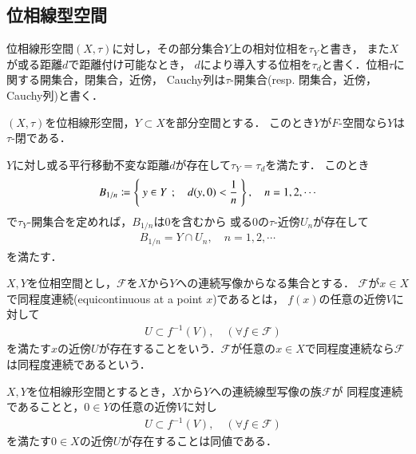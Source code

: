 \subsection{位相線型空間}
	
	位相線形空間$(X,\tau)$に対し，その部分集合$Y$上の相対位相を$\tau_Y$と書き，
	また$X$が或る距離$d$で距離付け可能なとき，
	$d$により導入する位相を$\tau_d$と書く．位相$\tau$に関する開集合，閉集合，近傍，
	Cauchy列は$\tau$-開集合(resp. 閉集合，近傍，Cauchy列)と書く．
	
	\begin{screen}
		\begin{thm}
			$(X,\tau)$を位相線形空間，$Y \subset X$を部分空間とする．
			このとき$Y$が$F$-空間なら$Y$は$\tau$-閉である．
		\end{thm}
	\end{screen}
	
	\begin{prf}
		$Y$に対し或る平行移動不変な距離$d$が存在して$\tau_Y = \tau_d$を満たす．
		このとき
		\begin{align}
			B_{1/n} \coloneqq \left\{\ y \in Y\ \, ; \quad d(y,0) < \frac{1}{n}\ \right\},
			\quad n=1,2,\cdots
		\end{align}
		で$\tau_Y$-開集合を定めれば，$B_{1/n}$は$0$を含むから
		或る0の$\tau$-近傍$U_n$が存在して
		\begin{align}
			B_{1/n} = Y \cap U_n, \quad n=1,2,\cdots
		\end{align}
		を満たす．
	\end{prf}
	
	\begin{screen}
		\begin{dfn}[同程度連続]
			$X,Y$を位相空間とし，$\mathscr{F}$を$X$から$Y$への連続写像からなる集合とする．
			$\mathscr{F}$が$x \in X$で同程度連続(equicontinuous at a point $x$)であるとは，
			$f(x)$の任意の近傍$V$に対して
			\begin{align}
				\quad U \subset f^{-1}(V),\quad (\forall f \in \mathscr{F})
			\end{align}
			を満たす$x$の近傍$U$が存在することをいう．$\mathscr{F}$が任意の$x \in X$で同程度連続なら$\mathscr{F}$は同程度連続であるという．
		\end{dfn}
	\end{screen}
	
	\begin{screen}
		\begin{thm}[位相線型空間における同程度連続性]
			$X,Y$を位相線形空間とするとき，$X$から$Y$への連続線型写像の族$\mathscr{F}$が
			同程度連続であることと，$0 \in Y$の任意の近傍$V$に対し
			\begin{align}
				\quad U \subset f^{-1}(V),\quad (\forall f \in \mathscr{F})
			\end{align}
			を満たす$0 \in X$の近傍$U$が存在することは同値である．
		\end{thm}
	\end{screen}
	
	\begin{prf}
		
	\end{prf}